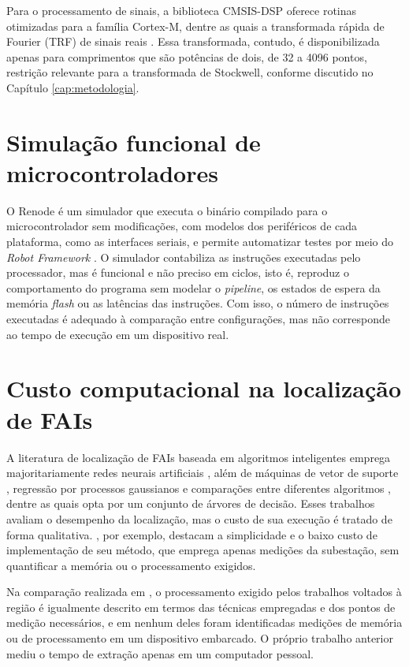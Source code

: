 \documentclass[
	12pt,				%
	openright,			%
	oneside,			%
	a4paper,			%
	english,			%
	brazil,				%
	]{abntex2}
\begin{document}
Para o processamento de sinais, a biblioteca CMSIS-DSP oferece rotinas otimizadas para a família Cortex-M, dentre as quais a transformada rápida de Fourier (TRF) de sinais reais \cite{arm_cmsisdsp}. Essa transformada, contudo, é disponibilizada apenas para comprimentos que são potências de dois, de 32 a 4096 pontos, restrição relevante para a transformada de Stockwell, conforme discutido no Capítulo \ref{cap:metodologia}.

\section{Simulação funcional de microcontroladores}
O Renode é um simulador que executa o binário compilado para o microcontrolador sem modificações, com modelos dos periféricos de cada plataforma, como as interfaces seriais, e permite automatizar testes por meio do \textit{Robot Framework} \cite{renode}. O simulador contabiliza as instruções executadas pelo processador, mas é funcional e não preciso em ciclos, isto é, reproduz o comportamento do programa sem modelar o \textit{pipeline}, os estados de espera da memória \textit{flash} ou as latências das instruções. Com isso, o número de instruções executadas é adequado à comparação entre configurações, mas não corresponde ao tempo de execução em um dispositivo real.

\section{Custo computacional na localização de FAIs}
A literatura de localização de FAIs baseada em algoritmos inteligentes emprega majoritariamente redes neurais artificiais \cite{[5], [8], [28]}, além de máquinas de vetor de suporte \cite{[27]}, regressão por processos gaussianos \cite{[25]} e comparações entre diferentes algoritmos \cite{[2], [6]}, dentre as quais \citeonline{[6]} opta por um conjunto de árvores de decisão. Esses trabalhos avaliam o desempenho da localização, mas o custo de sua execução é tratado de forma qualitativa. \citeonline{[5]}, por exemplo, destacam a simplicidade e o baixo custo de implementação de seu método, que emprega apenas medições da subestação, sem quantificar a memória ou o processamento exigidos.

Na comparação realizada em , o processamento exigido pelos trabalhos voltados à região é igualmente descrito em termos das técnicas empregadas e dos pontos de medição necessários, e em nenhum deles foram identificadas medições de memória ou de processamento em um dispositivo embarcado. O próprio trabalho anterior mediu o tempo de extração apenas em um computador pessoal.
\end{document}

